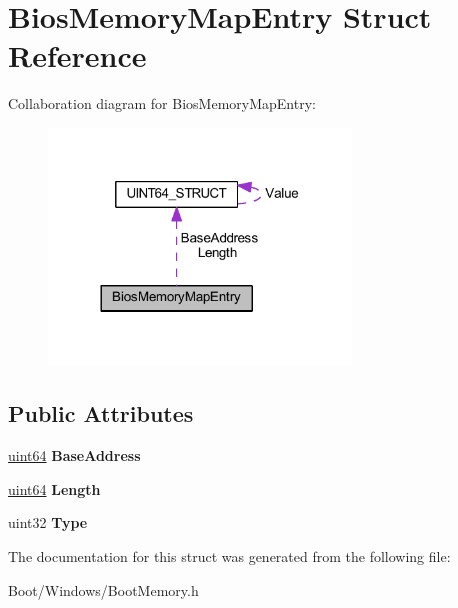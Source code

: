 \hypertarget{struct_bios_memory_map_entry}{}\section{Bios\+Memory\+Map\+Entry Struct Reference}
\label{struct_bios_memory_map_entry}


Collaboration diagram for Bios\+Memory\+Map\+Entry\+:
\nopagebreak
\begin{figure}[H]
\begin{center}
\leavevmode
\includegraphics[width=228pt]{struct_bios_memory_map_entry__coll__graph}
\end{center}
\end{figure}
\subsection*{Public Attributes}
\begin{DoxyCompactItemize}
\item 
\mbox{\label{struct_bios_memory_map_entry_ab50470e90693c09ca157308256842b15}} 
\hyperlink{union_u_i_n_t64___s_t_r_u_c_t}{uint64} {\bfseries Base\+Address}
\item 
\mbox{\label{struct_bios_memory_map_entry_a2fdf539cf8b492aa24dc42dcfc2bcdfc}} 
\hyperlink{union_u_i_n_t64___s_t_r_u_c_t}{uint64} {\bfseries Length}
\item 
\mbox{\label{struct_bios_memory_map_entry_a9c5f52ac7bb4c721011f482418f93c7f}} 
uint32 {\bfseries Type}
\end{DoxyCompactItemize}


The documentation for this struct was generated from the following file\+:\begin{DoxyCompactItemize}
\item 
Boot/\+Windows/Boot\+Memory.\+h\end{DoxyCompactItemize}
